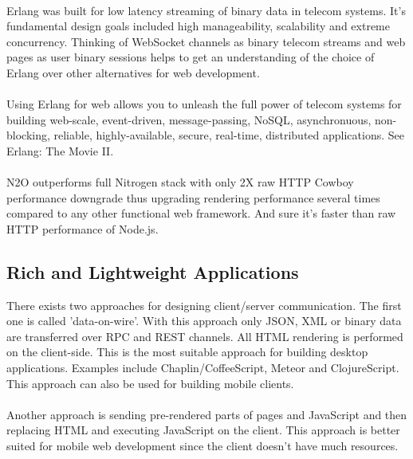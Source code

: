 
\paragraph{}
Erlang was built for low latency streaming of binary data in telecom systems.
It's fundamental design goals included high manageability, scalability
and extreme concurrency. Thinking of WebSocket channels as binary
telecom streams and web pages as user binary sessions
helps to get an understanding of the choice
of Erlang over other alternatives for web development.

\paragraph{}
Using Erlang for web allows you to unleash the full power of telecom systems for
building web-scale, event-driven, message-passing, NoSQL, asynchronuous, non-blocking,
reliable, highly-available, secure, real-time, distributed applications.
See Erlang: The Movie II.

\paragraph{}
N2O outperforms full Nitrogen stack with only 2X raw HTTP Cowboy
performance downgrade thus upgrading rendering performance several
times compared to any other functional web framework. And
sure it's faster than raw HTTP performance of Node.js.

\subsection{Rich and Lightweight Applications}
There exists two approaches for designing client/server communication.
The first one is called 'data-on-wire'. With this approach only JSON, XML or binary
data are transferred over RPC and REST channels. All HTML rendering
is performed on the client-side. This is the most suitable approach for building desktop
applications. Examples include Chaplin/CoffeeScript, Meteor
and ClojureScript. This approach can also be used for building mobile clients.

\paragraph{}
Another approach is sending pre-rendered parts of pages and JavaScript
and then replacing HTML and executing JavaScript on the client. This approach
is better suited for mobile web development since the
client doesn't have much resources.

